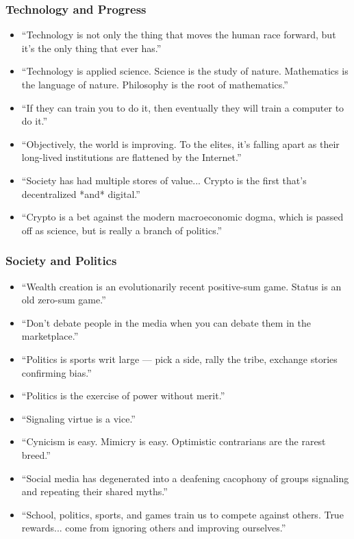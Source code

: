 \begin{frame}[fragile]\frametitle{Technology and Progress}
      \begin{itemize}
        \item “Technology is not only the thing that moves the human race forward, but it’s the only thing that ever has.”
        \item “Technology is applied science. Science is the study of nature. Mathematics is the language of nature. Philosophy is the root of mathematics.”
        \item “If they can train you to do it, then eventually they will train a computer to do it.”
        \item “Objectively, the world is improving. To the elites, it’s falling apart as their long-lived institutions are flattened by the Internet.”
        \item “Society has had multiple stores of value... Crypto is the first that’s decentralized *and* digital.”
        \item “Crypto is a bet against the modern macroeconomic dogma, which is passed off as science, but is really a branch of politics.”
      \end{itemize}
\end{frame}
\begin{frame}[fragile]\frametitle{Society and Politics}
      \begin{itemize}
        \item “Wealth creation is an evolutionarily recent positive-sum game. Status is an old zero-sum game.”
        \item “Don’t debate people in the media when you can debate them in the marketplace.”
        \item “Politics is sports writ large — pick a side, rally the tribe, exchange stories confirming bias.”
        \item “Politics is the exercise of power without merit.”
        \item “Signaling virtue is a vice.”
        \item “Cynicism is easy. Mimicry is easy. Optimistic contrarians are the rarest breed.”
        \item “Social media has degenerated into a deafening cacophony of groups signaling and repeating their shared myths.”
        \item “School, politics, sports, and games train us to compete against others. True rewards... come from ignoring others and improving ourselves.”
      \end{itemize}
\end{frame}

